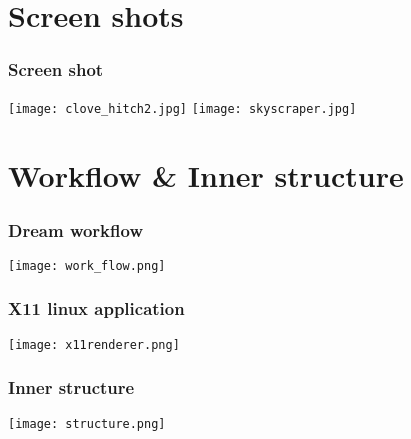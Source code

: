 \section{Screen shots} %
\begin{frame}\frametitle{Screen shot} 
\texttt{[image: clove\_hitch2.jpg]}
\texttt{[image: skyscraper.jpg]}
\end{frame}


\section{Workflow \& Inner structure} %
\begin{frame}\frametitle{Dream workflow} 
\begin{center}
\texttt{[image: work\_flow.png]}
\end{center}
\end{frame}

\begin{frame}\frametitle{X11 linux application} 
\begin{center}
\texttt{[image: x11renderer.png]}
\end{center}
\end{frame}

\begin{frame}\frametitle{Inner structure} 
\begin{center}
\texttt{[image: structure.png]}
\end{center}
\end{frame}


